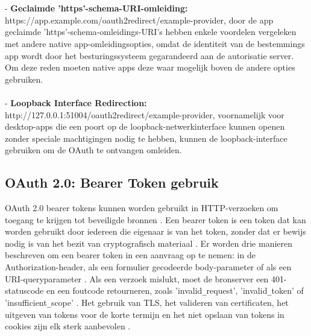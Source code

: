   \\\\
  - \textbf{Geclaimde 'https'-schema-URI-omleiding:} https://app.example.com/oauth2redirect/example-provider, door de app geclaimde 'https'-schema-omleidings-URI's hebben enkele voordelen vergeleken met andere native app-omleidingsopties, omdat de identiteit van de bestemmings app wordt door het besturingssysteem gegarandeerd aan de autorisatie server. Om deze reden moeten native apps deze waar mogelijk boven de andere opties gebruiken.
  \\\\
  - \textbf{Loopback Interface Redirection:} http://127.0.0.1:51004/oauth2redirect/example-provider, voornamelijk voor desktop-apps die een poort op de loopback-netwerkinterface kunnen openen zonder speciale machtigingen nodig te hebben, kunnen de loopback-interface gebruiken om de OAuth te ontvangen omleiden.

  
  \subsection{OAuth 2.0: Bearer Token gebruik}%
  \label{subsec:oauth-2.0-bearer-token-gebruik}
  OAuth 2.0 bearer tokens kunnen worden gebruikt in HTTP-verzoeken om toegang te krijgen tot beveiligde bronnen \autocite[p.~{Section 1.0}]{Jones2012}.
  Een bearer token is een token dat kan worden gebruikt door iedereen die eigenaar is van het token, zonder dat er bewijs nodig is van het bezit van cryptografisch materiaal \autocite[p.~{Section 1.2}]{Jones2012}.
  Er worden drie manieren beschreven om een bearer token in een aanvraag op te nemen: in de Authorization-header, als een formulier gecodeerde body-parameter of als een URI-queryparameter \autocite[p.~{Section 2.1}]{Jones2012}. Als een verzoek mislukt, moet de bronserver een 401-statuscode en een foutcode retourneren, zoals 'invalid\verb|_|request', 'invalid\verb|_|token' of 'insufficient\verb|_|scope' \autocite[p.~{Section 3.0}]{Jones2012}.
  Het gebruik van TLS, het valideren van certificaten, het uitgeven van tokens voor de korte termijn en het niet opslaan van tokens in cookies zijn elk sterk aanbevolen \autocite[p.~{Section 5.0}]{Jones2012}.


